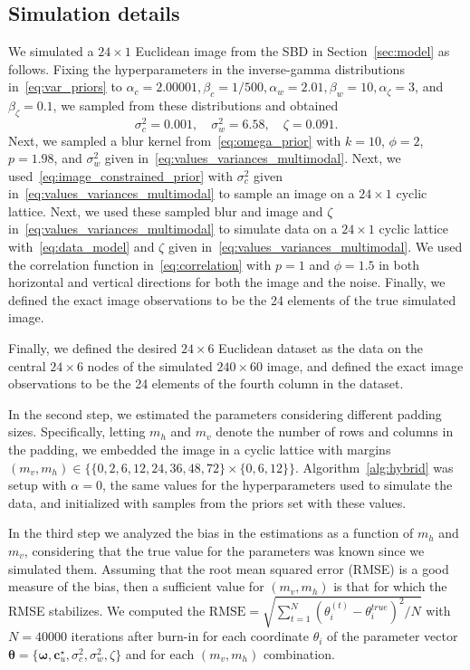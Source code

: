 \documentclass[12pt]{article}
\begin{document}
\subsection{Simulation details}\label{ap:simulation}
We simulated a $24 \times 1$ Euclidean image from the SBD in Section~\ref{sec:model} as follows. 
Fixing the hyperparameters in the inverse-gamma distributions in~\eqref{eq:var_priors} to $\alpha_c=2.00001, \beta_c=1/500, \alpha_w=2.01, \beta_w=10, \alpha_{\zeta}=3$, and $\beta_{\zeta}=0.1$, we sampled from these distributions and obtained
\begin{equation} \label{eq:values_variances_multimodal}
    \sigma_c^2=0.001, \quad \sigma_w^2=6.58, \quad \zeta=0.091.
\end{equation}
Next, we sampled a blur kernel from~\eqref{eq:omega_prior} with $k=10$, $\phi=2$, $p=1.98$, and $\sigma_w^2$ given in~\eqref{eq:values_variances_multimodal}. 
Next, we used~\eqref{eq:image_constrained_prior} with $\sigma_c^2$ given in~\eqref{eq:values_variances_multimodal} to sample an image on a $24 \times 1$ cyclic lattice. Next, we used these sampled blur and image and $\zeta$ in~\eqref{eq:values_variances_multimodal} to simulate data on a $24 \times 1$ cyclic lattice with~\eqref{eq:data_model} and $\zeta$ given in~\eqref{eq:values_variances_multimodal}.
We used the correlation function in~\ref{eq:correlation} with $p=1$ and $\phi=1.5$ in both horizontal and vertical directions for both the image and the noise. 
Finally, we defined the exact image observations to be the 24 elements of the true simulated image.

Finally, we defined the desired $24 \times 6$ Euclidean dataset as the data on the central $24 \times 6$ nodes of the simulated $240 \times 60$ image, and defined the exact image observations to be the 24 elements of the fourth column in the dataset. 

In the second step, we estimated the parameters considering different padding sizes. Specifically, letting $m_h$ and $m_v$ denote the number of rows and columns in the padding, we embedded the image in a cyclic lattice with margins $(m_v, m_h) \in \{ \{0, 2, 6, 12, 24, 36, 48, 72 \} \times \{0, 6, 12 \}\}$. 
Algorithm~\ref{alg:hybrid} was setup with $\alpha=0$, the same values for the hyperparameters used to simulate the data, and initialized with samples from the priors set with these values.

In the third step we analyzed the bias in the estimations as a function of $m_h$ and $m_v$, considering that the true value for the parameters was known since we simulated them. Assuming that the root mean squared error (RMSE) is a good measure of the bias, then a sufficient value for $(m_v, m_h)$ is that for which the RMSE stabilizes. 
We computed the $\text{RMSE}=\sqrt{\sum_{t=1}^{N}{(\theta_i^{(t)} - \theta_i^{true})^2}/N}$ with $N=40000$  iterations after burn-in for each coordinate $\theta_i$ of the parameter vector $\bm{\theta} = \{\bm{\omega}, \bm{c}_u^{\star}, \sigma_c^2, \sigma_{w}^2, \zeta\}$ and for each $(m_v, m_h)$ combination. 
\end{document}
